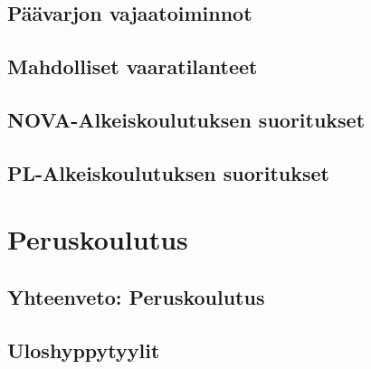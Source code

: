 \documentclass[10pt,twoside,openany,hidelinks]{memoir}
\begin{document}
\chapter{Päävarjon vajaatoiminnot}
\label{paavarjon-vajaatoiminnot}
\thispagestyle{headings}
\begin{multicols}{2}
\end{multicols}

\chapter{Mahdolliset vaaratilanteet}
\label{mahdolliset-vaaratilanteet}
\thispagestyle{headings}
\begin{multicols}{2}
\end{multicols}

\chapter{NOVA-Alkeiskoulutuksen suoritukset}
\label{nova-alkeiskoulutuksen-suoritukset}
\thispagestyle{headings}
\begin{multicols}{2}
\end{multicols}

\chapter{PL-Alkeiskoulutuksen suoritukset}
\label{pl-alkeiskoulutuksen-suoritukset}
\thispagestyle{headings}
\begin{multicols}{2}
\end{multicols}

\part{Peruskoulutus}\chapter{Yhteenveto: Peruskoulutus}
\label{yhteenveto-peruskoulutus}
\thispagestyle{headings}
\begin{multicols}{2}
\end{multicols}

\chapter{Uloshyppytyylit}
\label{uloshyppytyylit}
\thispagestyle{headings}
\begin{multicols}{2}
\end{multicols}
\end{document}
